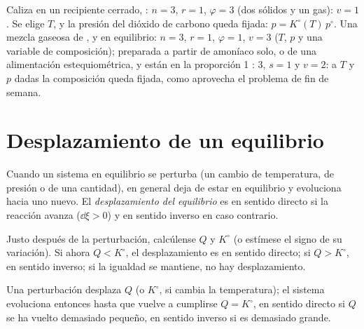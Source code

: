 \begin{example}\label{ex:b2:equilibrium-shifts:variances}
Caliza en un recipiente cerrado, : $n = 3$, $r =
1$, $\varphi = 3$ (dos sólidos y un gas): $v = 1$. Se elige $T$, y la presión
del dióxido de carbono queda fijada: $p = K^\circ(T)\,p^\circ$. Una mezcla gaseosa de
,  y  en equilibrio: $n = 3$, $r = 1$, $\varphi = 1$, $v
= 3$ ($T$, $p$ y una variable de composición); preparada a partir de amoníaco solo, o de
una alimentación estequiométrica,  y  están en la proporción 1 : 3, $s = 1$ y
$v = 2$: a $T$ y $p$ dadas la composición queda fijada, como aprovecha el problema de fin
de semana.
\end{example}

\section{Desplazamiento de un equilibrio}

\begin{definition}\label{def:b2:equilibrium-shifts:shift}
Cuando un sistema en equilibrio se perturba (un cambio de temperatura, de
presión o de una cantidad), en general deja de estar en equilibrio y
evoluciona hacia uno nuevo. El \emph{desplazamiento del equilibrio}
es en sentido directo si la reacción avanza ($\dd\xi > 0$) y en sentido inverso
en caso contrario.
\end{definition}

\begin{method}\label{met:b2:equilibrium-shifts:predict-shift}
Justo después de la perturbación, calcúlense $Q$ y $K^\circ$ (o estímese el signo de su
variación). Si ahora $Q < K^\circ$, el desplazamiento es en sentido directo; si $Q > K^\circ$,
en sentido inverso; si la igualdad se mantiene, no hay desplazamiento.
\end{method}

\begin{omfigure}

{\small Una perturbación desplaza $Q$ (o $K^\circ$, si cambia la temperatura);
el sistema evoluciona entonces hasta que vuelve a cumplirse $Q = K^\circ$, en sentido directo si $Q$ se ha vuelto
demasiado pequeño, en sentido inverso si es demasiado grande.}
\end{omfigure}

